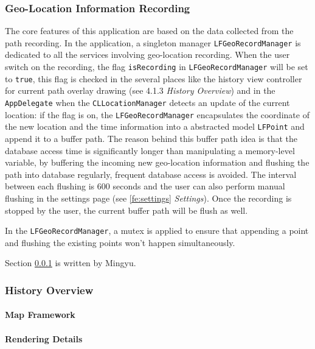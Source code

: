 \documentclass[12pt,a4paper]{article}
\begin{document}
            \subsubsection{Geo-Location Information Recording} %
            \label{fe:geolocation-information-recording}
            The core features of this application are based on the data collected from the path recording. In the application, a singleton manager \texttt{LFGeoRecordManager} is dedicated to all the services involving geo-location recording. When the user switch on the recording, the flag \texttt{isRecording} in \texttt{LFGeoRecordManager} will be set to \texttt{true}, this flag is checked in the several places like the history view controller for current path overlay drawing (see 4.1.3 \textit{History Overview}) and in the \texttt{AppDelegate} when the \texttt{CLLocationManager} detects an update of the current location: if the flag is on, the \texttt{LFGeoRecordManager} encapsulates the coordinate of the new location and the time information into a abstracted model \texttt{LFPoint} and append it to a buffer path. The reason behind this buffer path idea is that the database access time is significantly longer than manipulating a memory-level variable, by buffering the incoming new geo-location information and flushing the path into database regularly, frequent database access is avoided. The interval between each flushing is 600 seconds and the user can also perform manual flushing in the settings page (see \ref{fe:settings} \textit{Settings}). Once the recording is stopped by the user, the current buffer path will be flush as well.
            
            In the \texttt{LFGeoRecordManager}, a mutex is applied to ensure that appending a point and flushing the existing points won't happen simultaneously.
            
            \footnotesize
            Section \ref{fe:geolocation-information-recording} is written by Mingyu.
            \normalsize
            
            \subsubsection{History Overview}
                \paragraph{Map Framework} %
                \paragraph{Rendering Details} %
\end{document}
